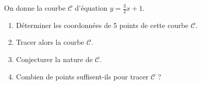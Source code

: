 
On donne la courbe $\mathscr{C}$ d'équation $y=\frac{3}{2}x+1$.
\begin{enumerate}
\item Déterminer les coordonnées de 5 points de cette courbe $\mathscr{C}$.
\item Tracer alors la courbe $\mathscr{C}$.
\item Conjecturer la nature de $\mathscr{C}$.
\item Combien de points suffisent-ils pour tracer $\mathscr{C}$ ?
\end{enumerate}